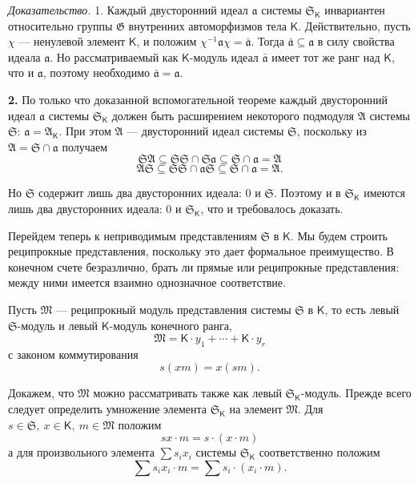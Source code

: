 \documentclass[11pt]{article}
\begin{document}
\emph{Доказательство.} 1. Каждый двусторонний идеал \(\mathfrak a\) системы \(\mathfrak S_{\mathsf K}\) инвариантен относительно группы \(\mathfrak G\) внутренних автоморфизмов тела \(\mathsf K\). Действительно, пусть \(\chi\) --- ненулевой элемент \(\mathsf K\), и положим \(\chi^{-1}\mathfrak a\chi=\bar{\mathfrak a}\). Тогда \(\bar{\mathfrak a}\subseteq\mathfrak a\) в силу свойства идеала \(\mathfrak a\). Но рассматриваемый как \(\mathsf K\)-модуль идеал \(\bar{\mathfrak a}\) имеет тот же ранг над \(\mathsf K\), что и \(\mathfrak a\), поэтому необходимо \(\bar{\mathfrak a}=\mathfrak a\).

\textbf{2.} По только что доказанной вспомогательной теореме каждый двусторонний идеал \(\mathfrak a\) системы \(\mathfrak S_{\mathsf K}\) должен быть расширением некоторого подмодуля \(\mathfrak A\) системы \(\mathfrak S\): \(\mathfrak a=\mathfrak A_{\mathsf K}\). При этом \(\mathfrak A\) --- двусторонний идеал системы \(\mathfrak S\), поскольку из \(\mathfrak A=\mathfrak S\cap\mathfrak a\) получаем
\[
\mathfrak S\mathfrak A\subseteq\mathfrak S\mathfrak S\cap\mathfrak S\mathfrak a\subseteq\mathfrak S\cap\mathfrak a=\mathfrak A
\]
\[
\mathfrak A\mathfrak S\subseteq\mathfrak S\mathfrak S\cap\mathfrak a\mathfrak S\subseteq\mathfrak S\cap\mathfrak a=\mathfrak A.
\]

Но \(\mathfrak S\) содержит лишь два двусторонних идеала: 0 и \(\mathfrak S\). Поэтому и в \(\mathfrak S_{\mathsf K}\) имеются лишь два двусторонних идеала: 0 и \(\mathfrak S_{\mathsf K}\), что и требовалось доказать.

Перейдем теперь к неприводимым представлениям \(\mathfrak S\) в \(\mathsf K\). Мы будем строить реципрокные представления, поскольку это дает формальное преимущество. В конечном счете безразлично, брать ли прямые или реципрокные представления: между ними имеется взаимно однозначное соответствие.

Пусть \(\mathfrak M\) --- реципрокный модуль представления системы \(\mathfrak S\) в \(\mathsf K\), то есть левый \(\mathfrak S\)-модуль и левый \(\mathsf K\)-модуль конечного ранга,
\[
\mathfrak M=\mathsf K\cdot y_1+\cdots+\mathsf K\cdot y_r
\]
с законом коммутирования
\[
s(xm)=x(sm).
\]

Докажем, что \(\mathfrak M\) можно рассматривать также как левый \(\mathfrak S_{\mathsf K}\)-модуль. Прежде всего следует определить умножение элемента \(\mathfrak S_{\mathsf K}\) на элемент \(\mathfrak M\). Для \(s\in\mathfrak S,\ x\in\mathsf K,\ m\in\mathfrak M\) положим
\[
sx\cdot m=s\cdot(x\cdot m)
\]
а для произвольного элемента \(\sum s_ix_i\) системы \(\mathfrak S_{\mathsf K}\) соответственно положим
\[
\sum s_ix_i\cdot m=\sum s_i\cdot(x_i\cdot m).
\]
\end{document}

